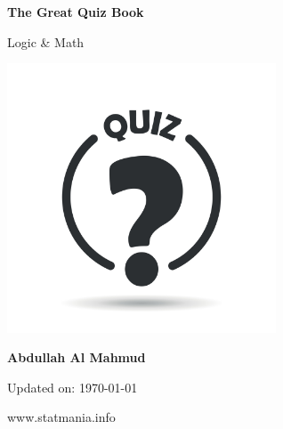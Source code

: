\documentclass{article}
\begin{document}
\begin{titlepage}
    \begin{center}
        \vspace*{1cm}
            
        \Huge
        \textbf{The Great Quiz Book}
            
        \vspace{0.5cm}
        \huge
        Logic \& Math
        
        \includegraphics[width=8cm]{img/quiz.jpg}
            
        \vspace{1.5cm}
            
        \textbf{Abdullah Al Mahmud}

     \vspace{1.5cm}

	\Large 
	Updated on: \today
	
	
            
        \vfill
            

            
        \vspace{0.8cm}
            

            
        \Large
        www.statmania.info\\
            
    \end{center}
\end{titlepage}
\end{document}
